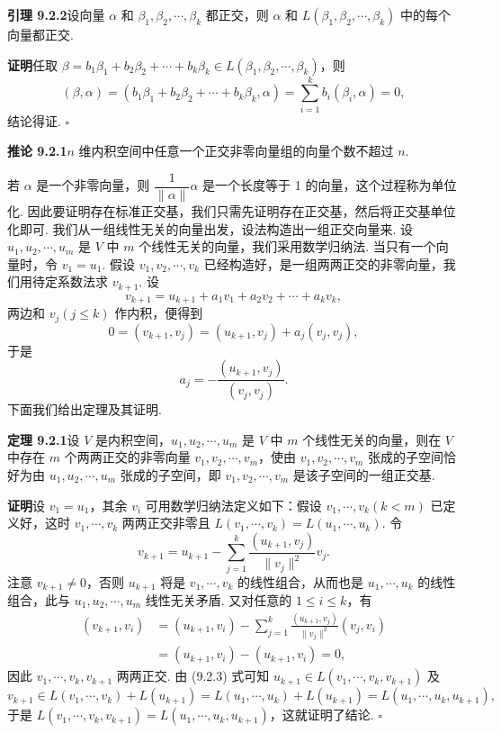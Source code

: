 \documentclass[UTF8,12pt,a4paper,fontset=fandol]{ctexart}
\begin{document}
\noindent\textbf{引理 9.2.2}\quad 设向量 $\alpha$ 和 $\beta_1,\beta_2,\cdots,\beta_k$ 都正交，则 $\alpha$ 和 $L(\beta_1,\beta_2,\cdots,\beta_k)$ 中的每个向量都正交.

\noindent\textbf{证明}\quad 任取 $\beta=b_1\beta_1+b_2\beta_2+\cdots+b_k\beta_k\in L(\beta_1,\beta_2,\cdots,\beta_k)$，则
\[
  (\beta,\alpha)=(b_1\beta_1+b_2\beta_2+\cdots+b_k\beta_k,\alpha)
  =\sum_{i=1}^k b_i(\beta_i,\alpha)=0,
\]
结论得证. $\square$

\noindent\textbf{推论 9.2.1}\quad $n$ 维内积空间中任意一个正交非零向量组的向量个数不超过 $n$.

若 $\alpha$ 是一个非零向量，则 $\dfrac1{\|\alpha\|}\alpha$ 是一个长度等于 1 的向量，这个过程称为单位化. 因此要证明存在标准正交基，我们只需先证明存在正交基，然后将正交基单位化即可. 我们从一组线性无关的向量出发，设法构造出一组正交向量来. 设 $u_1,u_2,\cdots,u_m$ 是 $V$ 中 $m$ 个线性无关的向量，我们采用数学归纳法. 当只有一个向量时，令 $v_1=u_1$. 假设 $v_1,v_2,\cdots,v_k$ 已经构造好，是一组两两正交的非零向量，我们用待定系数法求 $v_{k+1}$. 设
\[
  v_{k+1}=u_{k+1}+a_1v_1+a_2v_2+\cdots+a_kv_k,
\]
两边和 $v_j(j\le k)$ 作内积，便得到
\[
  0=(v_{k+1},v_j)=(u_{k+1},v_j)+a_j(v_j,v_j),
\]
于是
\[
  a_j=-\frac{(u_{k+1},v_j)}{(v_j,v_j)}.
\]
下面我们给出定理及其证明.

\noindent\textbf{定理 9.2.1}\quad 设 $V$ 是内积空间，$u_1,u_2,\cdots,u_m$ 是 $V$ 中 $m$ 个线性无关的向量，则在 $V$ 中存在 $m$ 个两两正交的非零向量 $v_1,v_2,\cdots,v_m$，使由 $v_1,v_2,\cdots,v_m$ 张成的子空间恰好为由 $u_1,u_2,\cdots,u_m$ 张成的子空间，即 $v_1,v_2,\cdots,v_m$ 是该子空间的一组正交基.

\noindent\textbf{证明}\quad 设 $v_1=u_1$，其余 $v_i$ 可用数学归纳法定义如下：假设 $v_1,\cdots,v_k(k<m)$ 已定义好，这时 $v_1,\cdots,v_k$ 两两正交非零且 $L(v_1,\cdots,v_k)=L(u_1,\cdots,u_k)$. 令
\begin{equation}
  v_{k+1}=u_{k+1}-\sum_{j=1}^k\frac{(u_{k+1},v_j)}{\|v_j\|^2}v_j.
  \tag{9.2.3}
\end{equation}
注意 $v_{k+1}\ne0$，否则 $u_{k+1}$ 将是 $v_1,\cdots,v_k$ 的线性组合，从而也是 $u_1,\cdots,u_k$ 的线性组合，此与 $u_1,u_2,\cdots,u_m$ 线性无关矛盾. 又对任意的 $1\le i\le k$，有
\[
\begin{aligned}
  (v_{k+1},v_i)
  &=(u_{k+1},v_i)-\sum_{j=1}^k\frac{(u_{k+1},v_j)}{\|v_j\|^2}(v_j,v_i)\\
  &=(u_{k+1},v_i)-(u_{k+1},v_i)=0,
\end{aligned}
\]
因此 $v_1,\cdots,v_k,v_{k+1}$ 两两正交. 由 (9.2.3) 式可知 $u_{k+1}\in L(v_1,\cdots,v_k,v_{k+1})$ 及
\[
  v_{k+1}\in L(v_1,\cdots,v_k)+L(u_{k+1})
  =L(u_1,\cdots,u_k)+L(u_{k+1})=L(u_1,\cdots,u_k,u_{k+1}),
\]
于是 $L(v_1,\cdots,v_k,v_{k+1})=L(u_1,\cdots,u_k,u_{k+1})$，这就证明了结论. $\square$
\end{document}

